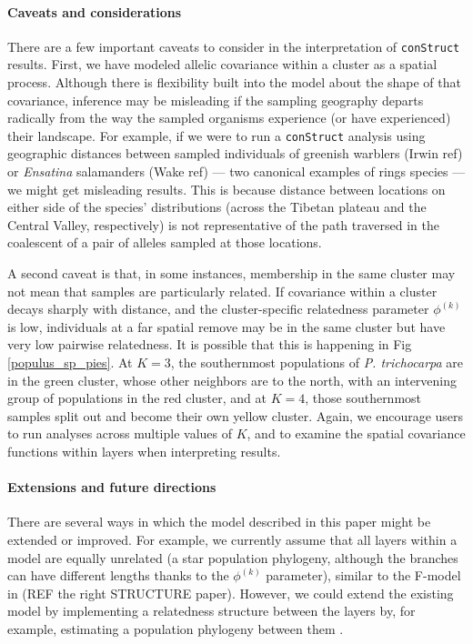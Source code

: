\documentclass[12pt]{article}
\newcommand{\gb}[1]{{\it\color{magenta}{(#1)}}}
\begin{document}
\paragraph{Caveats and considerations}
There are a few important caveats to consider in the interpretation of \texttt{conStruct} results. 
First, we have modeled allelic covariance within a cluster as a spatial process.
Although there is flexibility built into the model about the shape of that covariance, 
inference may be misleading if the sampling geography departs radically from the way 
the sampled organisms experience (or have experienced) their landscape.
For example, if we were to run a \texttt{conStruct} analysis using geographic distances between 
sampled individuals of greenish warblers (Irwin ref) or \textit{Ensatina} salamanders (Wake ref)
--- two canonical examples of rings species --- 
we might get misleading results.
This is because distance between locations on either side of the species' distributions
(across the Tibetan plateau and the Central Valley, respectively) 
is not representative of the path traversed in the coalescent of a pair of alleles sampled at those locations.

A second caveat is that, in some instances, 
membership in the same cluster may not mean that samples are particularly related.
If covariance within a cluster decays sharply with distance, 
and the cluster-specific relatedness parameter $\phi^{(k)}$ is low, 
individuals at a far spatial remove may be in the same cluster but have very low pairwise relatedness.
It is possible that this is happening in Fig \ref{populus_sp_pies}. 
At $K=3$, the southernmost populations of \textit{P. trichocarpa} are in the green cluster, 
whose other neighbors are to the north, with an intervening group of populations in the red cluster, 
and at $K=4$, those southernmost samples split out and become their own yellow cluster.
Again, we encourage users to run analyses across multiple values of $K$, 
and to examine the spatial covariance functions within layers when interpreting results.
\gb{missing data?}

\paragraph{Extensions and future directions}
There are several ways in which the model described in this paper might be extended or improved.  
For example, we currently assume that all layers within a model are equally unrelated 
(a star population phylogeny, although the branches can have different lengths thanks to the $\phi^{(k)}$ parameter), 
similar to the F-model in (REF the right STRUCTURE paper).
However, we could extend the existing model by implementing 
a relatedness structure between the layers by, for example, 
estimating a population phylogeny between them \citep[e.g.][]{treemix}.
\end{document}
